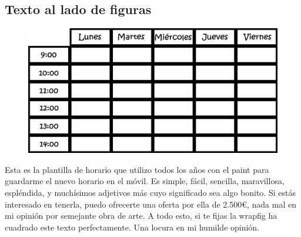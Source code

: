 \documentclass{article}
\begin{document}
    \subsection{Texto al lado de figuras}
        \begin{figure}
            \vspace{-13pt}
            \includegraphics[scale=0.1]{PlantillaHorario.png}
        \end{figure}
        Esta es la plantilla de horario que utilizo todos los años con el paint
        para guardarme el nuevo horario en el móvil. Es simple, fácil, sencilla,
        maravillosa, espléndida, y muchísimos adjetivos más cuyo significado sea 
        algo bonito. Si estás interesado en tenerla, puedo ofrecerte una oferta
        por ella de 2.500€, nada mal en mi opinión por semejante obra de arte. A 
        todo esto, si te fijas la wrapfig ha cuadrado este texto perfectamente. 
        Una locura en mi humilde opinión.
\end{document}
